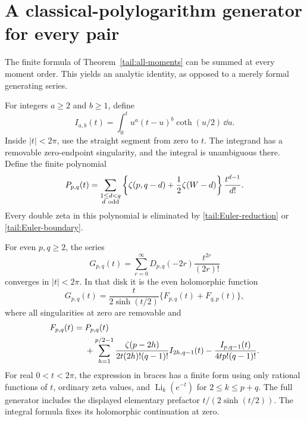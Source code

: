 \section{A classical-polylogarithm generator for every pair}
\label{tail:generator-section}

The finite formula of Theorem~\ref{tail:all-moments} can be summed
at every moment order. This yields an analytic identity, as opposed
to a merely formal generating series.

For integers \(a\ge2\) and \(b\ge1\), define
\begin{equation}\label{tail:I}
 I_{a,b}(t)=\int_0^t u^a(t-u)^b\coth(u/2)\,\dd u.
\end{equation}
Inside \(|t|<2\pi\), use the straight segment from zero to \(t\).
The integrand has a removable zero-endpoint singularity, and the
integral is unambiguous there. Define the finite polynomial
\begin{equation}\label{tail:P}
 P_{p,q}(t)=\sum_{\substack{1\le d<q\\d\ {
 \rm odd}}}
 \left\{\zeta(p,q-d)+\frac12\zeta(W-d)\right\}
                        \frac{t^{d-1}}{d!}.
\end{equation}
Every double zeta in this polynomial is eliminated by
\eqref{tail:Euler-reduction} or \eqref{tail:Euler-boundary}.

\begin{theorem}
\label{tail:generator}
For even \(p,q\ge2\), the series
\[
 G_{p,q}(t)=\sum_{r=0}^{\infty}
           D_{p,q}(-2r)\frac{t^{2r}}{(2r)!}
\]
converges in \(|t|<2\pi\). In that disk it is the even holomorphic
function
\begin{equation}\label{tail:generator-formula}
 \boxed{
 G_{p,q}(t)=\frac{t}{2\sinh(t/2)}
             \{F_{p,q}(t)+F_{q,p}(t)\},}
\end{equation}
where all singularities at zero are removable and
\begin{align}\label{tail:F}
 F_{p,q}(t)={}&P_{p,q}(t)\notag\\
 &+\sum_{h=1}^{p/2-1}
   \frac{\zeta(p-2h)}{2t(2h)!(q-1)!}
       I_{2h,q-1}(t)
  -\frac{I_{p,q-1}(t)}{4t p!(q-1)!}.
\end{align}
For real \(0<t<2\pi\), the expression in braces has a finite
form using only rational functions of \(t\), ordinary zeta values,
and \(\operatorname{Li}_k(e^{-t})\) for \(2\le k\le p+q\).
The full generator includes the displayed elementary prefactor
\(t/(2\sinh(t/2))\).
The integral formula fixes its holomorphic continuation at zero.
\end{theorem}

